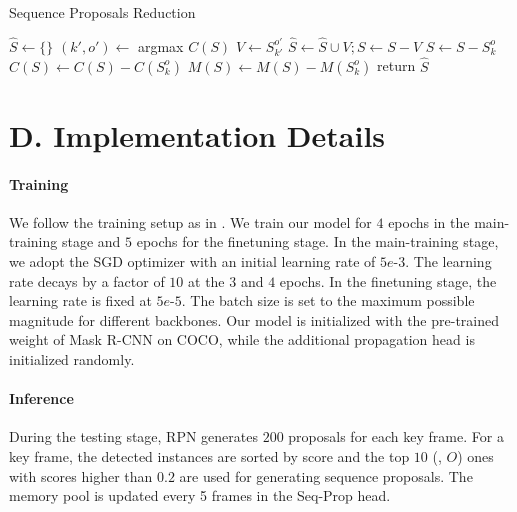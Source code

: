 \documentclass[10pt,twocolumn,letterpaper]{article}
\begin{document}
	
	\begin{algorithm}[t]\label{alg:iou} 
		\caption{Sequence Proposals Reduction} 
		
		$\widehat{S} \leftarrow \{\}$\;
		{
			$(k', o') \leftarrow$ argmax $C(S)$\;
			$V \leftarrow S_{k'}^{o'}$ \;
			$\widehat{S} \leftarrow \widehat{S} \cup V; S \leftarrow S - V$\;
			{
				{
					$S \leftarrow S - S_k^o$\;
					$C(S) \leftarrow C(S) - C(S_k^o)$\;
					$M(S) \leftarrow M(S) - M(S_k^o)$\;
				}
			}
		}
		return $\widehat{S}$\;	
	\end{algorithm}
	
	\vspace{-0.05in}
	\section*{D. Implementation Details} \label{sec:implement}
	\paragraph{Training} We follow the training setup as in \cite{he2017mask}. We train our model for $4$ epochs in the main-training stage and $5$ epochs for the finetuning stage. In the main-training stage, we adopt the SGD optimizer with an initial learning rate of $5e$-$3$. The learning rate decays by a factor of $10$ at the $3$ and $4$ epochs. In the finetuning stage, the learning rate is fixed at $5e$-$5$. The batch size is set to the maximum possible magnitude for different backbones. Our model is initialized with the pre-trained weight of Mask R-CNN \cite{he2017mask} on COCO, while the additional propagation head is initialized randomly.
	
	\vspace{-0.2in}
	\paragraph{Inference} During the testing stage, RPN generates $200$ proposals for each key frame. For a key frame, the detected instances are sorted by score and the top $10$ (\ie, $O$) ones with scores higher than $0.2$ are used for generating sequence proposals. 
	The memory pool is updated every 5 frames in the Seq-Prop head.
	
\end{document}
